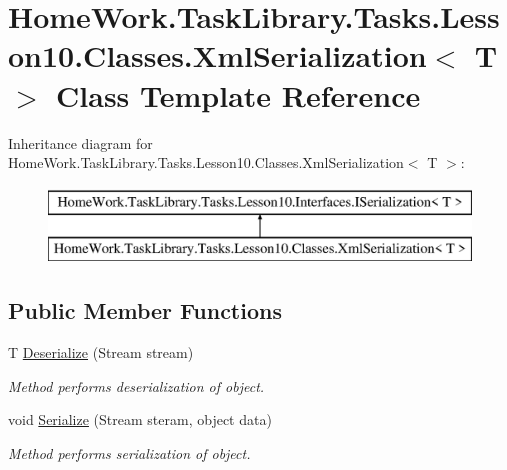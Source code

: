 \hypertarget{class_home_work_1_1_task_library_1_1_tasks_1_1_lesson10_1_1_classes_1_1_xml_serialization}{}\section{Home\+Work.\+Task\+Library.\+Tasks.\+Lesson10.\+Classes.\+Xml\+Serialization$<$ T $>$ Class Template Reference}
\label{class_home_work_1_1_task_library_1_1_tasks_1_1_lesson10_1_1_classes_1_1_xml_serialization}
Inheritance diagram for Home\+Work.\+Task\+Library.\+Tasks.\+Lesson10.\+Classes.\+Xml\+Serialization$<$ T $>$\+:\begin{figure}[H]
\begin{center}
\leavevmode
\includegraphics[height=2.000000cm]{class_home_work_1_1_task_library_1_1_tasks_1_1_lesson10_1_1_classes_1_1_xml_serialization}
\end{center}
\end{figure}
\subsection*{Public Member Functions}
\begin{DoxyCompactItemize}
\item 
T \mbox{\hyperlink{class_home_work_1_1_task_library_1_1_tasks_1_1_lesson10_1_1_classes_1_1_xml_serialization_aff3a34468846222e582c51d6994cea90}{Deserialize}} (Stream stream)
\begin{DoxyCompactList}\small\item\em Method performs deserialization of object. \end{DoxyCompactList}\item 
void \mbox{\hyperlink{class_home_work_1_1_task_library_1_1_tasks_1_1_lesson10_1_1_classes_1_1_xml_serialization_a3ece7a66984022b60389d4cb5c5404f7}{Serialize}} (Stream steram, object data)
\begin{DoxyCompactList}\small\item\em Method performs serialization of object. \end{DoxyCompactList}\end{DoxyCompactItemize}


